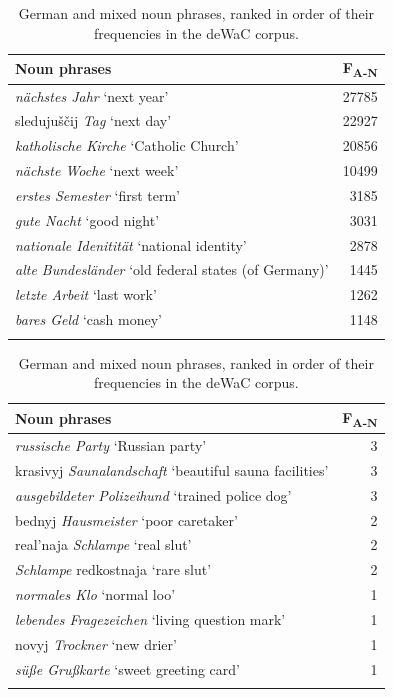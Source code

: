 \begin{table}
		\begin{tabular}{lr}
		    \lsptoprule
			Noun phrases	& \multicolumn{1}{c}{F\textsubscript{A-N}} \\ \midrule
			\textit{nächstes Jahr} `next year'	&27785\\
			sledujuščij \textit{Tag} `next day'	&22927\\
			\textit{katholische Kirche} `Catholic Church'	&20856\\
			\textit{nächste Woche}	`next week'	&10499\\
			\textit{erstes Semester} `first term'	&3185\\
			\textit{gute Nacht} `good night'	&3031\\
			\textit{nationale Idenitität} `national identity'	&2878\\
			\textit{alte Bundesländer} `old federal states (of Germany)'	&1445\\
			\textit{letzte Arbeit} `last work'	&1262\\
			\textit{bares Geld} `cash money'	&1148\\
			\lspbottomrule 
		\end{tabular}
\caption{German and mixed noun phrases, ranked in order of their frequencies in the deWaC corpus.\label{tab:4:7}} 
\end{table}

\begin{table}
		\begin{tabular}{lr}
		\lsptoprule
			Noun phrases	& \multicolumn{1}{c}{F\textsubscript{A-N}} \\\midrule
			\textit{russische Party} `Russian party'		&3\\
			krasivyj \textit{Saunalandschaft} `beautiful sauna facilities'	&3\\
			\textit{ausgebildeter Polizeihund} `trained police dog'	&3\\
			bednyj \textit{Hausmeister} `poor caretaker'		&2\\
			real'naja \textit{Schlampe} `real slut'	&2\\
			\textit{Schlampe} redkostnaja `rare slut'		&2\\
			\textit{normales Klo} `normal loo'	&1\\
			\textit{lebendes Fragezeichen} `living question mark'	&1\\
			novyj \textit{Trockner} `new drier'	&1\\
			\textit{süße Grußkarte} `sweet greeting card'	&1\\
			\lspbottomrule
		\end{tabular}
\caption{German and mixed noun phrases, ranked in order of their frequencies in the deWaC corpus.\label{tab:4:8}} 
\end{table}

